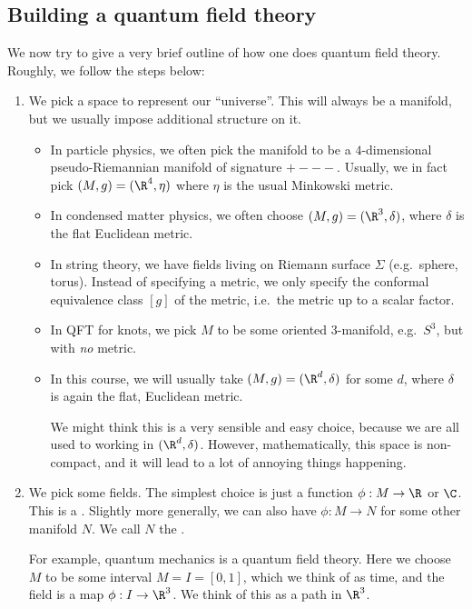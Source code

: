 \documentclass[a4paper]{article}
\begin{document}
\subsection{Building a quantum field theory}
We now try to give a very brief outline of how one does quantum field theory. Roughly, we follow the steps below:
\begin{enumerate}
  \item We pick a space to represent our ``universe''. This will always be a manifold, but we usually impose additional structure on it.
    \begin{itemize}
      \item In particle physics, we often pick the manifold to be a $4$-dimensional pseudo-Riemannian manifold of signature $+---$. Usually, we in fact pick $(M, g) = (\R^4, \eta)$ where $\eta$ is the usual Minkowski metric.
      \item In condensed matter physics, we often choose $(M, g) = (\R^3, \delta)$, where $\delta$ is the flat Euclidean metric.
      \item In string theory, we have fields living on Riemann surface $\Sigma$ (e.g.\ sphere, torus). Instead of specifying a metric, we only specify the conformal equivalence class $[g]$ of the metric, i.e.\ the metric up to a scalar factor.
      \item In QFT for knots, we pick $M$ to be some oriented $3$-manifold, e.g.\ $S^3$, but with \emph{no} metric.
      \item In this course, we will usually take $(M, g) = (\R^d, \delta)$ for some $d$, where $\delta$ is again the flat, Euclidean metric.

        We might think this is a very sensible and easy choice, because we are all used to working in $(\R^d, \delta)$. However, mathematically, this space is non-compact, and it will lead to a lot of annoying things happening.
    \end{itemize}
  \item We pick some fields. The simplest choice is just a function $\phi: M \to \R$ or $\C$. This is a . Slightly more generally, we can also have $\phi: M \to N$ for some other manifold $N$. We call $N$ the .

    For example, quantum mechanics is a quantum field theory. Here we choose $M$ to be some interval $M = I = [0, 1]$, which we think of as time, and the field is a map $\phi: I \to \R^3$. We think of this as a path in $\R^3$.
    \begin{center}
\end{center}
\end{enumerate}
\end{document}

